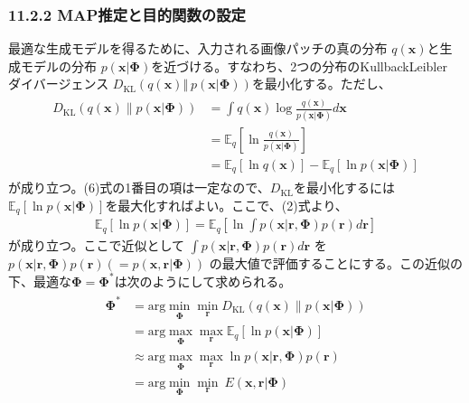 \documentclass[letterpaper,10pt,english]{sphinxmanual}
\begin{document}
\subsubsection{11.2.2 MAP推定と目的関数の設定}
\label{\detokenize{11-2_sparse-coding:map}}
最適な生成モデルを得るために、入力される画像パッチの真の分布 \(q(\mathbf{x})\)と生成モデルの分布 \(p(\mathbf{x}|\mathbf{\Phi})\)を近づける。すなわち、2つの分布のKullback\sphinxhyphen{}Leibler ダイバージェンス \(D_{\text{KL}}\left(q(\mathbf{x}) \Vert\ p(\mathbf{x}|\mathbf{\Phi})\right)\)を最小化する。ただし、
\begin{equation*}
\begin{split}
\begin{align}
D_{\text{KL}}(q(\mathbf{x}) \| p(\mathbf{x}|\mathbf{\Phi}))&=\int q(\mathbf{x}) \log \frac{q(\mathbf{x})}{p(\mathbf{x}|\mathbf{\Phi})} d\mathbf{x}\\
&=\mathbb{E}_q \left[\ln \frac{q(\mathbf{x})}{p(\mathbf{x}|\mathbf{\Phi})}\right]\\
&=\mathbb{E}_q \left[\ln q(\mathbf{x})\right]-\mathbb{E}_q \left[\ln p(\mathbf{x}|\mathbf{\Phi})\right] \tag{6}
\end{align}
\end{split}
\end{equation*}
が成り立つ。(6)式の1番目の項は一定なので、\(D_{\text{KL}}\)を最小化するには\(\mathbb{E}_q \left[\ln p(\mathbf{x}|\mathbf{\Phi})\right]\)を最大化すればよい。ここで、(2)式より、
\begin{equation*}
\begin{split}
\mathbb{E}_q \left[\ln p(\mathbf{x}|\mathbf{\Phi})\right]=\mathbb{E}_q \left[\ln \int p(\mathbf{x}|\mathbf{r}, \mathbf{\Phi})p(\mathbf{r})d\mathbf{r}\right]\tag{7}
\end{split}
\end{equation*}
が成り立つ。ここで近似として \(\int p(\mathbf{x}|\mathbf{r}, \mathbf{\Phi})p(\mathbf{r})d\mathbf{r}\) を \(p(\mathbf{x}|\mathbf{r}, \mathbf{\Phi})p(\mathbf{r}) \left(=p(\mathbf{x}, \mathbf{r}| \mathbf{\Phi})\right)\) の最大値で評価することにする。この近似の下、最適な\(\mathbf{\Phi}=\mathbf{\Phi}^*\)は次のようにして求められる。
\begin{equation*}
\begin{split}
\begin{align}
\mathbf{\Phi}^*&=\text{arg} \min_{\mathbf{\Phi}} \min_{\mathbf{r}} D_{\text{KL}}(q(\mathbf{x}) \| p(\mathbf{x}|\mathbf{\Phi}))\\
&=\text{arg} \max_{\mathbf{\Phi}} \max_{\mathbf{r}} \mathbb{E}_q \left[\ln p(\mathbf{x}|\mathbf{\Phi})\right]\\
&\approx \text{arg} \max_{\mathbf{\Phi}}\max_{\mathbf{r}} \ln p(\mathbf{x}|\mathbf{r}, \mathbf{\Phi})p(\mathbf{r})\\
&=\text{arg}\min_{\mathbf{\Phi}} \min_{\mathbf{r}}\ E(\mathbf{x}, \mathbf{r}|\mathbf{\Phi})\tag{8}
\end{align}
\end{split}
\end{equation*}
\end{document}
